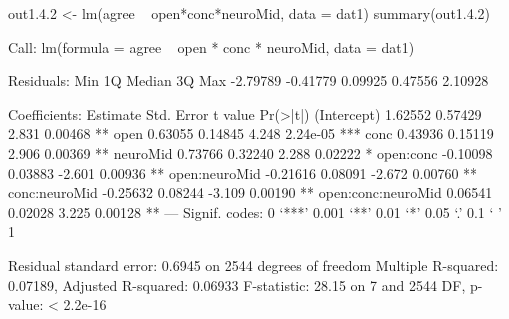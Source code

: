 \begin{Schunk}
\begin{Sinput}
 out1.4.2 <- lm(agree ~ open*conc*neuroMid, data = dat1)
 summary(out1.4.2)
\end{Sinput}
\begin{Soutput}
Call:
lm(formula = agree ~ open * conc * neuroMid, data = dat1)

Residuals:
     Min       1Q   Median       3Q      Max 
-2.79789 -0.41779  0.09925  0.47556  2.10928 

Coefficients:
                   Estimate Std. Error t value Pr(>|t|)    
(Intercept)         1.62552    0.57429   2.831  0.00468 ** 
open                0.63055    0.14845   4.248 2.24e-05 ***
conc                0.43936    0.15119   2.906  0.00369 ** 
neuroMid            0.73766    0.32240   2.288  0.02222 *  
open:conc          -0.10098    0.03883  -2.601  0.00936 ** 
open:neuroMid      -0.21616    0.08091  -2.672  0.00760 ** 
conc:neuroMid      -0.25632    0.08244  -3.109  0.00190 ** 
open:conc:neuroMid  0.06541    0.02028   3.225  0.00128 ** 
---
Signif. codes:  0 ‘***’ 0.001 ‘**’ 0.01 ‘*’ 0.05 ‘.’ 0.1 ‘ ’ 1

Residual standard error: 0.6945 on 2544 degrees of freedom
Multiple R-squared:  0.07189,	Adjusted R-squared:  0.06933 
F-statistic: 28.15 on 7 and 2544 DF,  p-value: < 2.2e-16
\end{Soutput}
\end{Schunk}
